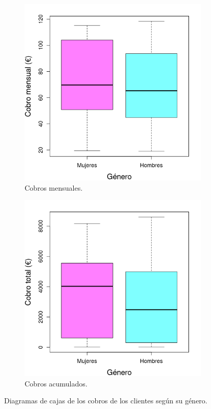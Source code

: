 \documentclass[10pt,a4paper]{article}
\begin{document}
\begin{figure}[!htb]
     \centering
     \begin{subfigure}[b]{0.4\textwidth}
         \centering
         \includegraphics[width=\textwidth]{month-gen-box}
         \caption{Cobros mensuales.}
		 \label{fig:month-gen-box}
	 \end{subfigure}\hspace{1cm}
     \begin{subfigure}[b]{0.4\textwidth}
         \centering
         \includegraphics[width=\textwidth]{total-gen-box}
         \caption{Cobros acumulados.}
		 \label{fig:total-gen-box}
     \end{subfigure}
        \caption{Diagramas de cajas de los cobros de los clientes según su género.}
		\label{fig:gen-box}
\end{figure}
\end{document}
